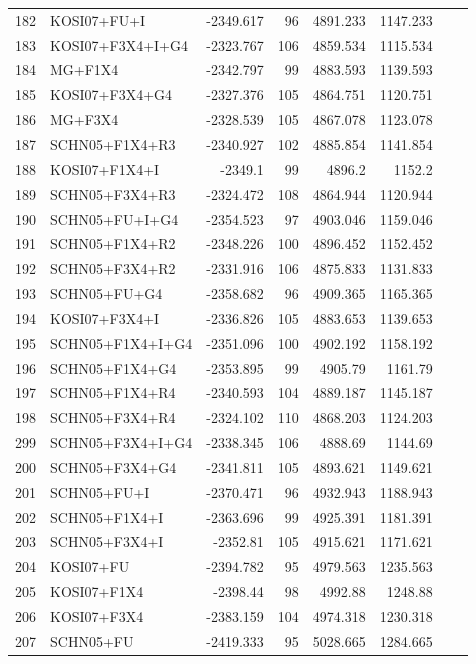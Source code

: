 \begin{longtable}{clrrrrrr}
	182 & KOSI07+FU+I & -2349.617 & 96 & 4891.233 & 1147.233 \\ 
	183 & KOSI07+F3X4+I+G4 & -2323.767 & 106 & 4859.534 & 1115.534 \\ 
	184 & MG+F1X4 & -2342.797 & 99 & 4883.593 & 1139.593 & \\ 
	185 & KOSI07+F3X4+G4 & -2327.376 & 105 & 4864.751 & 1120.751 \\ 
	186 & MG+F3X4 & -2328.539 & 105 & 4867.078 & 1123.078 \\ 
	187 & SCHN05+F1X4+R3 & -2340.927 & 102 & 4885.854 & 1141.854 \\ 
	188 & KOSI07+F1X4+I & -2349.1 & 99 & 4896.2 & 1152.2 & \\ 
	189 & SCHN05+F3X4+R3 & -2324.472 & 108 & 4864.944 & 1120.944 \\ 
	190 & SCHN05+FU+I+G4 & -2354.523 & 97 & 4903.046 & 1159.046 \\ 
	191 & SCHN05+F1X4+R2 & -2348.226 & 100 & 4896.452 & 1152.452 \\ 
	192 & SCHN05+F3X4+R2 & -2331.916 & 106 & 4875.833 & 1131.833 \\ 
	193 & SCHN05+FU+G4 & -2358.682 & 96 & 4909.365 & 1165.365 \\ 
	194 & KOSI07+F3X4+I & -2336.826 & 105 & 4883.653 & 1139.653 \\ 
	195 & SCHN05+F1X4+I+G4 & -2351.096 & 100 & 4902.192 & 1158.192 \\ 
	196 & SCHN05+F1X4+G4 & -2353.895 & 99 & 4905.79 & 1161.79 \\ 
	197 & SCHN05+F1X4+R4 & -2340.593 & 104 & 4889.187 & 1145.187 \\ 
	198 & SCHN05+F3X4+R4 & -2324.102 & 110 & 4868.203 & 1124.203 \\ 
	299 & SCHN05+F3X4+I+G4 & -2338.345 & 106 & 4888.69 & 1144.69 \\ 
	200 & SCHN05+F3X4+G4 & -2341.811 & 105 & 4893.621 & 1149.621 \\ 
	201 & SCHN05+FU+I & -2370.471 & 96 & 4932.943 & 1188.943 \\ 
	202 & SCHN05+F1X4+I & -2363.696 & 99 & 4925.391 & 1181.391 \\ 
	203 & SCHN05+F3X4+I & -2352.81 & 105 & 4915.621 & 1171.621 \\ 
	204 & KOSI07+FU & -2394.782 & 95 & 4979.563 & 1235.563 \\ 
	205 & KOSI07+F1X4 & -2398.44 & 98 & 4992.88 & 1248.88 \\ 
	206 & KOSI07+F3X4 & -2383.159 & 104 & 4974.318 & 1230.318 \\ 
	207 & SCHN05+FU & -2419.333 & 95 & 5028.665 & 1284.665 \\ 

\end{longtable}
